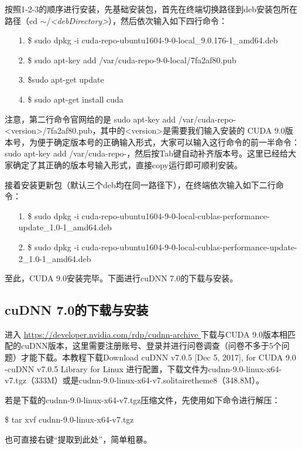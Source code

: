 \documentclass[11pt,a4paper]{ctexart}
\begin{document}
按照1-2-3的顺序进行安装，先基础安装包，首先在终端切换路径到deb安装包所在路径（cd $\sim$/\emph{<debDirectory>}），然后依次输入如下四行命令：
\begin{itemize}
\item[1.] \$ sudo dpkg -i cuda-repo-ubuntu1604-9-0-local\_9.0.176-1\_amd64.deb
\item[2.] \$ sudo apt-key add /var/cuda-repo-{\color{red}9-0-local}/7fa2af80.pub 
\item[3.] \$sudo  apt-get update
\item[4.] \$ sudo apt-get install cuda
\end{itemize}
注意，第二行命令官网给的是 sudo apt-key add /var/cuda-repo-{\color{red}<version>}/7fa2af80.pub，其中的{\color{red}<version>}是需要我们输入安装的 CUDA 9.0版本号，为便于确定版本号的正确输入形式，大家可以输入这行命令的前一半命令：sudo apt-key add /var/cuda-repo-，然后按{\color{red}Tab}键自动补齐版本号。这里已经给大家确定了其正确的版本号输入形式，直接copy运行即可顺利安装。

接着安装更新包（默认三个deb均在同一路径下），在终端依次输入如下二行命令：
\vspace{-0.2cm}
\begin{itemize}
\item[1.] \$ sudo dpkg -i cuda-repo-ubuntu1604-9-0-local-cublas-performance-update\_1.0-1\_amd64.deb 
\item[2.] \$ sudo dpkg -i cuda-repo-ubuntu1604-9-0-local-cublas-performance-update-2\_1.0-1\_amd64.deb 
\end{itemize}

至此，CUDA 9.0安装完毕。下面进行cuDNN 7.0的下载与安装。



\subsection{ cuDNN 7.0的下载与安装}
进入 \url {https://developer.nvidia.com/rdp/cudnn-archive } 下载与CUDA  9.0版本相匹配的cuDNN版本，这里需要注册账号、登录并进行问卷调查（问卷不多于5个问题）才能下载。本教程下载Download cuDNN v7.0.5 [Dec 5, 2017], for CUDA 9.0 -cuDNN v7.0.5 Library for Linux 进行配置，下载文件为cudnn-9.0-linux-x64-v7.tgz（333M）或是cudnn-9.0-linux-x64-v7.solitairetheme8（348.8M）。

若是下载的cudnn-9.0-linux-x64-v7.tgz压缩文件，先使用如下命令进行解压：
\begin{center}
\$ tar xvf cudnn-9.0-linux-x64-v7.tgz
\end{center}
也可直接右键“提取到此处”，简单粗暴。
\end{document}
